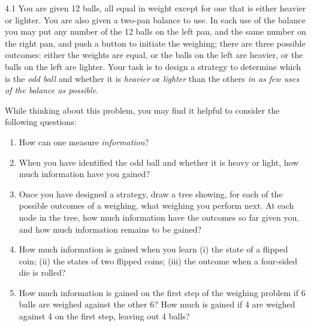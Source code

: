 \documentclass[12pt, a4paper]{article}
\begin{document}
\begin{prob}{4.1}
You are given 12 balls, all equal in weight except for one that is either heavier or lighter. You are also given a two-pan balance to use. In each use of the balance you may put any number of the 12 balls on the left pan, and the same number on the right pan, and push a button to initiate the weighing; there are three possible outcomes: either the weights are equal, or the balls on the left are heavier, or the balls on the left are lighter. Your task is to design a strategy to determine which is the \textit{odd ball} and whether it is \textit{heavier} or \textit{lighter} than the others \textit{in as few uses of the balance as possible}.

While thinking about this problem, you may find it helpful to consider the following questions:

\begin{enumerate}
    \item[(a)] How can one measure \textit{information}?
    \item[(b)] When you have identified the odd ball and whether it is heavy or light, how much information have you gained?
    \item[(c)] Once you have designed a strategy, draw a tree showing, for each of the possible outcomes of a weighing, what weighing you perform next. At each node in the tree, how much information have the outcomes so far given you, and how much information remains to be gained?
    \item[(d)] How much information is gained when you learn (i) the state of a flipped coin; (ii) the states of two flipped coins; (iii) the outcome when a four-sided die is rolled?
    \item[(e)] How much information is gained on the first step of the weighing problem if 6 balls are weighed against the other 6? How much is gained if 4 are weighed against 4 on the first step, leaving out 4 balls?
\end{enumerate}
\end{prob}
\end{document}
